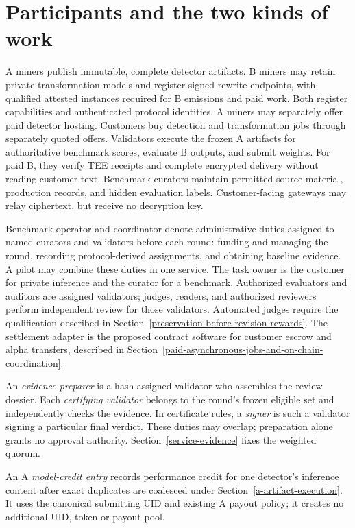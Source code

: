 \section{Participants and the two kinds of
work}\label{participants-and-the-two-kinds-of-work}

A miners publish immutable, complete detector artifacts. B miners may
retain private transformation models and register signed rewrite endpoints,
with qualified attested instances required for B emissions and paid work.
Both register capabilities and authenticated protocol identities. A miners
may separately offer paid detector hosting. Customers buy detection and transformation
jobs through separately quoted offers. Validators execute the frozen A
artifacts for authoritative benchmark scores, evaluate B outputs, and
submit weights. For paid B, they verify TEE receipts and complete encrypted
delivery without reading customer text. Benchmark curators maintain
permitted source material, production records, and hidden evaluation
labels. Customer-facing gateways may relay ciphertext, but receive no
decryption key.

Benchmark operator and coordinator denote administrative duties assigned
to named curators and validators before each round: funding and managing
the round, recording protocol-derived assignments, and obtaining baseline evidence. A pilot may
combine these duties in one service. The task owner is the customer for
private inference and the curator for a benchmark. Authorized evaluators
and auditors are assigned validators; judges, readers, and authorized
reviewers perform independent review for those validators. Automated
judges require the qualification described in
Section~\ref{preservation-before-revision-rewards}. The settlement adapter
is the proposed contract software for customer escrow and alpha
transfers, described in
Section~\ref{paid-asynchronous-jobs-and-on-chain-coordination}.

An \emph{evidence preparer} is a hash-assigned validator who assembles
the review dossier. Each \emph{certifying validator} belongs to the round's
frozen eligible set and independently checks the evidence. In certificate
rules, a \emph{signer} is such a validator signing a particular final
verdict. These duties may overlap; preparation alone grants no approval
authority. Section~\ref{service-evidence} fixes the weighted quorum.

An A \emph{model-credit entry} records performance credit for one
detector's inference content after exact duplicates are coalesced under
Section~\ref{a-artifact-execution}. It uses the canonical submitting UID
and existing A payout policy; it creates no additional UID, token or
payout pool.

